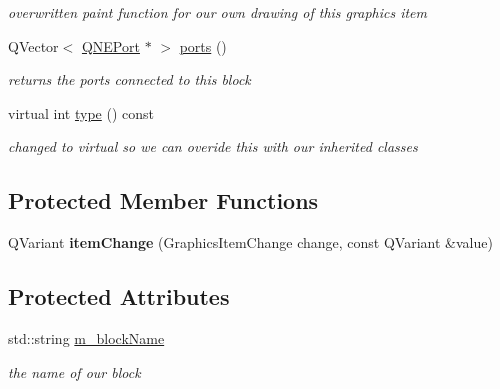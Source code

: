 \begin{DoxyCompactItemize}
\begin{DoxyCompactList}\small\item\em overwritten paint function for our own drawing of this graphics item \end{DoxyCompactList}\item 
\hypertarget{class_q_n_e_block_ab36daa69f4c9ef4e6f415c591d9257b7}{Q\-Vector$<$ \hyperlink{class_q_n_e_port}{Q\-N\-E\-Port} $\ast$ $>$ \hyperlink{class_q_n_e_block_ab36daa69f4c9ef4e6f415c591d9257b7}{ports} ()}\label{class_q_n_e_block_ab36daa69f4c9ef4e6f415c591d9257b7}

\begin{DoxyCompactList}\small\item\em returns the ports connected to this block \end{DoxyCompactList}\item 
\hypertarget{class_q_n_e_block_ae89757c66e7f97583aabb3dc72b66a55}{virtual int \hyperlink{class_q_n_e_block_ae89757c66e7f97583aabb3dc72b66a55}{type} () const }\label{class_q_n_e_block_ae89757c66e7f97583aabb3dc72b66a55}

\begin{DoxyCompactList}\small\item\em changed to virtual so we can overide this with our inherited classes \end{DoxyCompactList}\end{DoxyCompactItemize}
\subsection*{Protected Member Functions}
\begin{DoxyCompactItemize}
\item 
\hypertarget{class_q_n_e_block_a594af80d0c6079bcb4175c9152e36310}{Q\-Variant {\bfseries item\-Change} (Graphics\-Item\-Change change, const Q\-Variant \&value)}\label{class_q_n_e_block_a594af80d0c6079bcb4175c9152e36310}

\end{DoxyCompactItemize}
\subsection*{Protected Attributes}
\begin{DoxyCompactItemize}
\item 
\hypertarget{class_q_n_e_block_ad62454889e17fbae99f52ea46766cafb}{std\-::string \hyperlink{class_q_n_e_block_ad62454889e17fbae99f52ea46766cafb}{m\-\_\-block\-Name}}\label{class_q_n_e_block_ad62454889e17fbae99f52ea46766cafb}

\begin{DoxyCompactList}\small\item\em the name of our block \end{DoxyCompactList}\end{DoxyCompactItemize}
